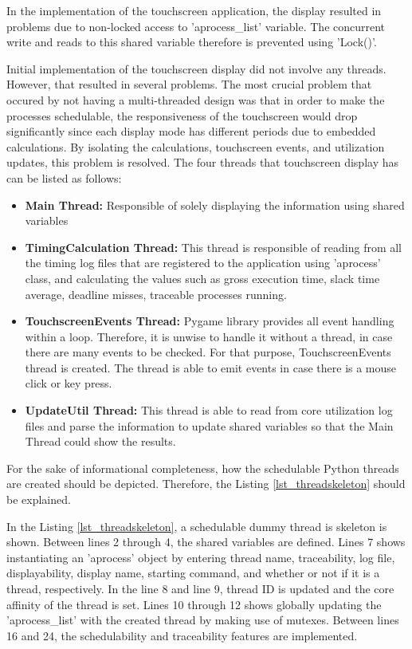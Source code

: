 In the implementation of the touchscreen application, the display resulted in problems due to non-locked access to 'aprocess{\_}list' variable. The concurrent write and reads to this shared variable therefore is prevented using 'Lock()'.

Initial implementation of the touchscreen display did not involve any threads. However, that resulted in several problems. The most crucial problem that occured by not having a multi-threaded design was that in order to make the processes schedulable, the responsiveness of the touchscreen would drop significantly since each display mode has different periods due to embedded calculations. By isolating the calculations, touchscreen events, and utilization updates, this problem is resolved. The four threads that touchscreen display has can be listed as follows:

\begin{itemize}
	\item \textbf{Main Thread:} Responsible of solely displaying the information using shared variables
	\item \textbf{TimingCalculation Thread:} This thread is responsible of reading from all the timing log files that are registered to the application using 'aprocess' class, and calculating the values such as gross execution time, slack time average, deadline misses, traceable processes running.
	\item \textbf{TouchscreenEvents Thread:} Pygame library provides all event handling within a loop. Therefore, it is unwise to handle it without a thread, in case there are many events to be checked. For that purpose, TouchscreenEvents thread is created. The thread is able to emit events in case there is a mouse click or key press.
	\item \textbf{UpdateUtil Thread:} This thread is able to read from core utilization log files and parse the information to update shared variables so that the Main Thread could show the results.
\end{itemize}

For the sake of informational completeness, how the schedulable Python threads are created should be depicted. Therefore, the Listing \ref{lst_threadskeleton} should be explained.

\newpage


In the Listing \ref{lst_threadskeleton}, a schedulable dummy thread is skeleton is shown. Between lines 2 through 4, the shared variables are defined. Lines 7 shows instantiating an 'aprocess' object by entering thread name, traceability, log file, displayability, display name, starting command, and whether or not if it is a thread, respectively. In the line 8 and line 9, thread ID is updated and the core affinity of the thread is set. Lines 10 through 12 shows globally updating the 'aprocess{\_}list' with the created thread by making use of mutexes. Between lines 16 and 24, the schedulability and traceability features are implemented.

